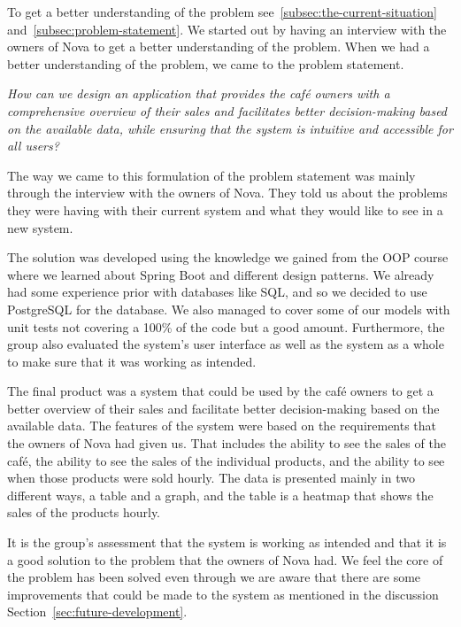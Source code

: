To get a better understanding of the problem see~\ref{subsec:the-current-situation} and~\ref{subsec:problem-statement}.
We started out by having an interview with the owners of Nova to get a better understanding of the problem.
When we had a better understanding of the problem, we came to the problem statement.

\textit{How can we design an application that provides the café owners with a comprehensive overview of their sales and
facilitates better decision-making based on the available data, while ensuring that the system is intuitive and
accessible for all users?}

The way we came to this formulation of the problem statement was mainly through the interview with the owners of Nova.
They told us about the problems they were having with their current system and what they would like to see in a
new system.

The solution was developed using the knowledge we gained from the OOP course where we learned about Spring Boot and
different design patterns.
We already had some experience prior with databases like SQL, and so we decided to use PostgreSQL for the database.
We also managed to cover some of our models with unit tests not covering a 100\% of the code but a good amount.
Furthermore, the group also evaluated the system's user interface as well as the system as a whole to make sure that it
was working as intended.

The final product was a system that could be used by the café owners to get a better overview of their sales and
facilitate better decision-making based on the available data.
The features of the system were based on the requirements that the owners of Nova had given us.
That includes the ability to see the sales of the café, the ability to see the sales of the individual products, and the
ability to see when those products were sold hourly.
The data is presented mainly in two different ways, a table and a graph, and the table is a heatmap that shows the sales
of the products hourly.

It is the group's assessment that the system is working as intended
and that it is a good solution to the problem that the owners of Nova had.
We feel the core of the problem has been solved even through we are aware that there are some improvements that could
be made to the system as mentioned in the discussion Section~\ref{sec:future-development}.
